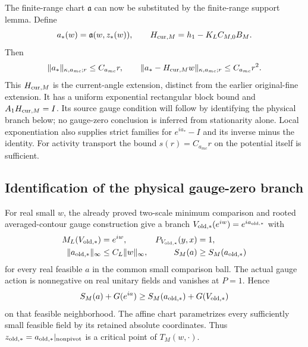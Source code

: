 \documentclass[11pt]{article}
\theoremstyle{remark}\newtheorem{remark}[theorem]{Remark}
\begin{document}
The finite-range chart $\mathfrak a$ can now be substituted by the
finite-range support lemma. Define
\begin{equation}
 a_*(w)=\mathfrak a(w,z_*(w)),\qquad
 H_{{\rm cur},M}=h_1-K_LC_{M,0}B_M.                          \label{st-current-extension}
\end{equation}
Then
\begin{equation}
 \|a_*\|_{\kappa,a_{
m c};r}\le C_{a_{
m c}}r,
 \qquad
 \|a_*-H_{{\rm cur},M}w\|_{\kappa,a_{
m c};r}
                                      \le C_{a_{
m c}}r^2.          \label{st-current-support}
\end{equation}
This $H_{{\rm cur},M}$ is the current-angle extension, distinct from the
earlier original-fine extension. It has a uniform exponential
rectangular block bound and $A_1H_{{\rm cur},M}=I$. Its source gauge
condition will follow by identifying the physical branch below; no
gauge-zero conclusion is inferred from stationarity alone. Local
exponentiation also supplies strict families for $e^{ia_*}-I$ and its
inverse minus the identity. For activity transport the bound
$s(r)=C_{a_{
m c}}r$ on the potential itself is sufficient.

\subsection{Identification of the physical gauge-zero branch}
\label{st-identification-section}

For real small $w$, the already proved two-scale minimum comparison and
rooted averaged-contour gauge construction give a branch
$V_{{\rm old},*}(e^{iw})=e^{ia_{{\rm old},*}}$ with
\begin{align}
 M_L(V_{{\rm old},*})&=e^{iw},& P_{V_{{\rm old},*}}(y,x)&=1,\notag\\
 \|a_{{\rm old},*}\|_\infty&\le C_L\|w\|_\infty,&
 S_M(a)&\ge S_M(a_{{\rm old},*})                           \label{st-known-minimum}
\end{align}
for every real feasible $a$ in the common small comparison ball. The
actual gauge action is nonnegative on real unitary fields and vanishes
at $P=1$. Hence
\begin{equation}
 S_M(a)+G(e^{ia})\ge S_M(a_{{\rm old},*})+G(V_{{\rm old},*})
                                                               \label{st-action-comparison}
\end{equation}
on that feasible neighborhood. The affine chart parametrizes every
sufficiently small feasible field by its retained absolute coordinates.
Thus $z_{{\rm old},*}=a_{{\rm old},*}|_{\rm nonpivot}$ is a critical
point of $T_M(w,\cdot)$.
\end{document}
